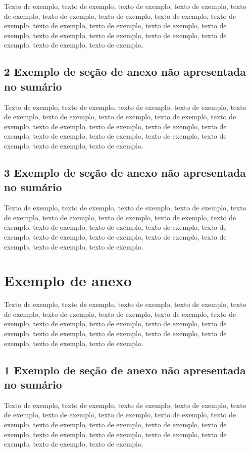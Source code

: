 \documentclass[
	12pt,				%
	oneside,			%
	a4paper,			%
	english,			%
	brazil				%
	]{abntex2ppgsi}
\begin{document}
\begin{anexosenv}
Texto de exemplo, texto de exemplo, texto de exemplo, texto de exemplo, texto de exemplo, texto de exemplo, texto de exemplo, texto de exemplo, texto de exemplo, texto de exemplo, texto de exemplo, texto de exemplo, texto de exemplo, texto de exemplo, texto de exemplo, texto de exemplo, texto de exemplo, texto de exemplo, texto de exemplo.

\section*{2 Exemplo de seção de anexo não apresentada no sumário}

Texto de exemplo, texto de exemplo, texto de exemplo, texto de exemplo, texto de exemplo, texto de exemplo, texto de exemplo, texto de exemplo, texto de exemplo, texto de exemplo, texto de exemplo, texto de exemplo, texto de exemplo, texto de exemplo, texto de exemplo, texto de exemplo, texto de exemplo, texto de exemplo, texto de exemplo.

\section*{3 Exemplo de seção de anexo não apresentada no sumário}

Texto de exemplo, texto de exemplo, texto de exemplo, texto de exemplo, texto de exemplo, texto de exemplo, texto de exemplo, texto de exemplo, texto de exemplo, texto de exemplo, texto de exemplo, texto de exemplo, texto de exemplo, texto de exemplo, texto de exemplo, texto de exemplo, texto de exemplo, texto de exemplo, texto de exemplo.

\chapter{Exemplo de anexo}

Texto de exemplo, texto de exemplo, texto de exemplo, texto de exemplo, texto de exemplo, texto de exemplo, texto de exemplo, texto de exemplo, texto de exemplo, texto de exemplo, texto de exemplo, texto de exemplo, texto de exemplo, texto de exemplo, texto de exemplo, texto de exemplo, texto de exemplo, texto de exemplo, texto de exemplo.

\section*{1 Exemplo de seção de anexo não apresentada no sumário}

Texto de exemplo, texto de exemplo, texto de exemplo, texto de exemplo, texto de exemplo, texto de exemplo, texto de exemplo, texto de exemplo, texto de exemplo, texto de exemplo, texto de exemplo, texto de exemplo, texto de exemplo, texto de exemplo, texto de exemplo, texto de exemplo, texto de exemplo, texto de exemplo, texto de exemplo.


\end{anexosenv}
\end{document}
